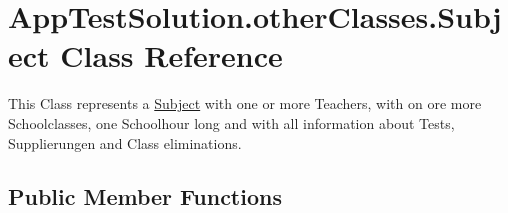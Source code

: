 \hypertarget{class_app_test_solution_1_1other_classes_1_1_subject}{\section{App\-Test\-Solution.\-other\-Classes.\-Subject Class Reference}
\label{class_app_test_solution_1_1other_classes_1_1_subject}
}


This Class represents a \hyperlink{class_app_test_solution_1_1other_classes_1_1_subject}{Subject} with one or more Teachers, with on ore more Schoolclasses, one Schoolhour long and with all information about Tests, Supplierungen and Class eliminations.  


\subsection*{Public Member Functions}
